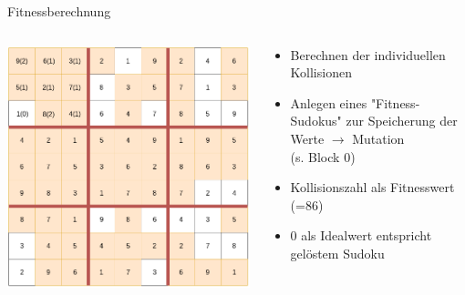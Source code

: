 \begin{frame}{Fitnessberechnung}
    \begin{columns}[T] %
        \begin{column}{0.75\textwidth}
            \includegraphics[width=\textwidth]{Pictures/Collision-Fitness.png}
        \end{column}
        \begin{column}{0.35\textwidth}
            \begin{itemize}
                \item Berechnen der individuellen Kollisionen
                \item Anlegen eines "{}Fitness-Sudokus{}" zur Speicherung der Werte \(\rightarrow\) Mutation \\
                (s. Block 0)
                \item Kollisionszahl als Fitnesswert (=86)
                \item 0 als Idealwert entspricht gelöstem Sudoku
            \end{itemize}
        \end{column}
    \end{columns}
\end{frame}
